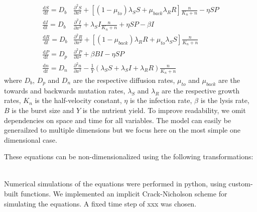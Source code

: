 \begin{align}
    \frac{\text{d}S}{\text{d}t} = D_b &\frac{\partial^2S}{\partial x^2} + \left[ \left( 1 - \mu_{to} \right) \lambda_S S + \mu_{back} \lambda_R R \right] \frac{n}{K_n+n}  - \eta SP \\
    \frac{\text{d}I}{\text{d}t} = D_b &\frac{\partial^2I}{\partial x^2} + \lambda_S I \frac{n}{K_n+n}  + \eta SP - \beta I\\
    \frac{\text{d}R}{\text{d}t} = D_b &\frac{\partial^2R}{\partial x^2} + \left[ \left( 1 - \mu_{back} \right) \lambda_R R + \mu_{to} \lambda_S S \right] \frac{n}{K_n+n}\\
    \frac{\text{d}P}{\text{d}t} = D_p &\frac{\partial^2P}{\partial x^2} + \beta BI - \eta SP \\
    \frac{\text{d}n}{\text{d}t} = D_n &\frac{\partial^2n}{\partial x^2} - \frac{1}{Y} \left( \lambda_S S + \lambda_S I + \lambda_R R \right) \frac{n}{K_n+n}
\end{align}
where $D_b$, $D_p$ and $D_n$ are the respective diffusion rates, $\mu_{to}$ and $\mu_{back}$ are the towards and backwards mutation rates, $\lambda_S$ and $\lambda_R$ are the respective growth rates, $K_n$ is the half-velocity constant, $\eta$ is the infection rate, $\beta$ is the lysis rate, $B$ is the burst size and $Y$ is the nutrient yield. To improve readability, we omit dependencies on space and time for all variables. The model can easily be generailzed to multiple dimensions but we focus here on the most simple one dimensional case.

These equations can be non-dimensionalized using the following transformations:

\begin{align}

\end{align}


Numerical simulations of the equations were performed in python, using custom-built functions. We implemented an implicit Crack-Nicholson scheme for simulating the equations. A fixed time step of xxx was chosen.  